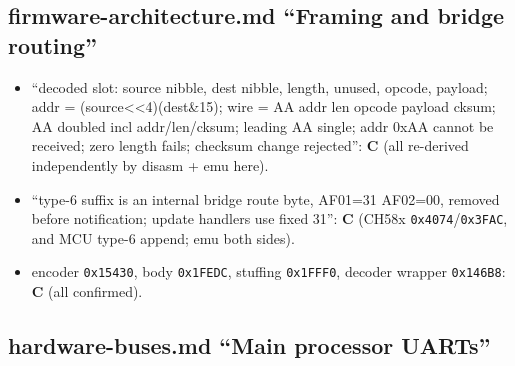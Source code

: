 \subsection{firmware-architecture.md ``Framing and bridge
routing''}\label{firmware-architecture.md-framing-and-bridge-routing}

\begin{itemize}
\tightlist
\item
  ``decoded slot: source nibble, dest nibble, length, unused, opcode,
  payload; addr = (source\textless\textless4)\textbar(dest\&15); wire =
  AA addr len opcode payload cksum; AA doubled incl addr/len/cksum;
  leading AA single; addr 0xAA cannot be received; zero length fails;
  checksum change rejected'': \textbf{C} (all re-derived independently
  by disasm + emu here).
\item
  ``type-6 suffix is an internal bridge route byte, AF01=31 AF02=00,
  removed before notification; update handlers use fixed 31'':
  \textbf{C} (CH58x \texttt{0x4074}/\texttt{0x3FAC}, and MCU type-6
  append; emu both sides).
\item
  encoder \texttt{0x15430}, body \texttt{0x1FEDC}, stuffing
  \texttt{0x1FFF0}, decoder wrapper \texttt{0x146B8}: \textbf{C} (all
  confirmed).
\end{itemize}

\subsection{hardware-buses.md ``Main processor
UARTs''}\label{hardware-buses.md-main-processor-uarts}

